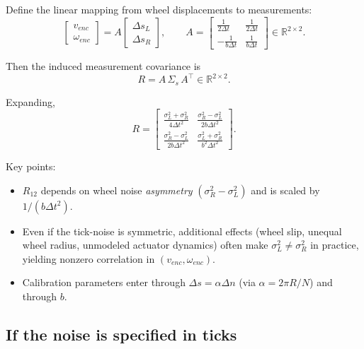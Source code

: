 \documentclass[11pt]{article}
\begin{document}
Define the linear mapping from wheel displacements to measurements:
\begin{equation}
\begin{bmatrix}
v_{enc}\\
\omega_{enc}
\end{bmatrix}
=
A
\begin{bmatrix}
\Delta s_L\\
\Delta s_R
\end{bmatrix},
\qquad
A =
\begin{bmatrix}
\frac{1}{2\Delta t} & \frac{1}{2\Delta t}\\
-\frac{1}{b\Delta t} & \frac{1}{b\Delta t}
\end{bmatrix}
\in\mathbb{R}^{2\times 2}.
\end{equation}

Then the induced measurement covariance is
\begin{equation}
\boxed{R = A\,\Sigma_s\,A^\top \in \mathbb{R}^{2\times2}.}
\end{equation}

Expanding,
\begin{equation}
R =
\begin{bmatrix}
\frac{\sigma_L^2+\sigma_R^2}{4\Delta t^2} & \frac{\sigma_R^2-\sigma_L^2}{2b\Delta t^2}\\[6pt]
\frac{\sigma_R^2-\sigma_L^2}{2b\Delta t^2} & \frac{\sigma_L^2+\sigma_R^2}{b^2\Delta t^2}
\end{bmatrix}.
\end{equation}

Key points:
\begin{itemize}
\item $R_{12}$ depends on wheel noise \emph{asymmetry} $(\sigma_R^2-\sigma_L^2)$ and is scaled by $1/(b\Delta t^2)$.
\item Even if the tick-noise is symmetric, additional effects (wheel slip, unequal wheel radius, unmodeled actuator dynamics)
often make $\sigma_L^2\neq\sigma_R^2$ in practice, yielding nonzero correlation in $(v_{enc},\omega_{enc})$.
\item Calibration parameters enter through $\Delta s=\alpha\Delta n$ (via $\alpha=2\pi R/N$) and through $b$.
\end{itemize}

\subsection*{If the noise is specified in ticks}
\end{document}
